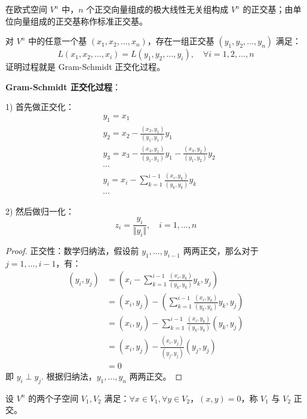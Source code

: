 \begin{definition}
在欧式空间 $V^n$ 中，$n$ 个正交向量组成的极大线性无关组构成 $V^n$ 的正交基；由单位向量组成的正交基称作标准正交基。
\end{definition}

\begin{theorem}[任意欧式空间中都存在一组正交基]
对 $V^n$ 中的任意一个基 $(x_1,x_2,\ldots,x_n)$，存在一组正交基 $(y_1,y_2,\ldots,y_n)$ 满足：
\[
L(x_1,x_2,\ldots,x_i)=L(y_1,y_2,\ldots,y_i),\quad\forall i=1,2,\ldots,n
\]
证明过程就是 Gram-Schmidt 正交化过程。
\end{theorem}

\vskip 6pt \noindent\textbf{Gram-Schmidt 正交化过程}：

1) 首先做正交化：
\begin{align*}
    &y_1=x_1\\
    &y_2=x_2-\frac{(x_2,y_1)}{(y_1,y_1)}y_1\\
    &y_3=x_3-\frac{(x_3,y_1)}{(y_1,y_1)}y_1-\frac{(x_3,y_2)}{(y_1,y_2)}y_2\\
    &\cdots\\
    &y_i=x_i-\sum_{k=1}^{i-1}\frac{(x_i,y_k)}{(y_k,y_k)}y_k\\
    &\cdots
\end{align*}

2) 然后做归一化：
\[
    z_i=\frac{y_i}{\Vert y_i\Vert},\quad i=1,\ldots,n
\]
\begin{proof}
正交性：数学归纳法，假设前 $y_1,\ldots,y_{i-1}$ 两两正交，那么对于 $j=1,\ldots,i-1$，有：
\begin{align*}
    (y_i,y_j)&=\left(x_i-\sum_{k=1}^{i-1}\frac{(x_i,y_k)}{(y_k,y_k)}y_k,y_j\right)\\
    &=(x_i,y_j)-\left(\sum_{k=1}^{i-1}\frac{(x_i,y_k)}{(y_k,y_k)}y_k,y_j\right)\\
    &=(x_i,y_j)-\sum_{k=1}^{i-1}\frac{(x_i,y_k)}{(y_k,y_k)}(y_k,y_j)\\
    &=(x_i,y_j)-\frac{(x_i,y_j)}{(y_j,y_j)}(y_j,y_j)\\
    &=0
\end{align*}
即 $y_i\perp y_j$. 根据归纳法，$y_1,\ldots,y_n$ 两两正交。
\end{proof}

\begin{definition}[子空间的正交性]
设 $V^n$ 的两个子空间 $V_1,V_2$ 满足：$\forall x\in V_1,\forall y\in V_2$，$(x,y)=0$，称 $V_1$ 与 $V_2$ 正交。
\end{definition}

